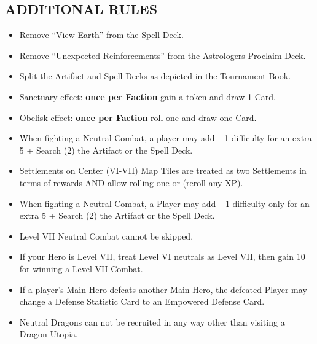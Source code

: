 \begin{multicols*}{2}
\subsection*{\MakeUppercase{Additional Rules}}
\begin{itemize}
  \item Remove ``View Earth'' from the Spell Deck.
  \item Remove ``Unexpected Reinforcements'' from the Astrologers Proclaim Deck.
  \item Split the Artifact and Spell Decks as depicted in the Tournament Book. %
  \item Sanctuary effect: \textbf{once per Faction} gain a  token and draw 1 Card.
  \item Obelisk effect: \textbf{once per Faction} roll one  and draw one Card.
  \item When fighting a Neutral Combat, a player may add +1 difficulty for an extra 5  + Search (2) the Artifact or the Spell Deck.
  \item Settlements on Center (VI-VII) Map Tiles are treated as two Settlements in terms of rewards AND allow rolling one  or  (reroll any XP).
  \item When fighting a Neutral Combat, a Player may add +1 difficulty only for an extra 5  + Search (2) the Artifact or the Spell Deck. %
  \item Level VII Neutral Combat cannot be skipped.
  \item If your Hero is Level VII, treat Level VI neutrals as Level VII, then gain 10  for winning a Level VII Combat. %
  \item If a player's Main Hero defeats another Main Hero, the defeated Player may change a Defense Statistic Card to an Empowered Defense Card. %
  \item Neutral Dragons can not be recruited in any way other than visiting a Dragon Utopia.


\end{itemize}
\end{multicols*}
